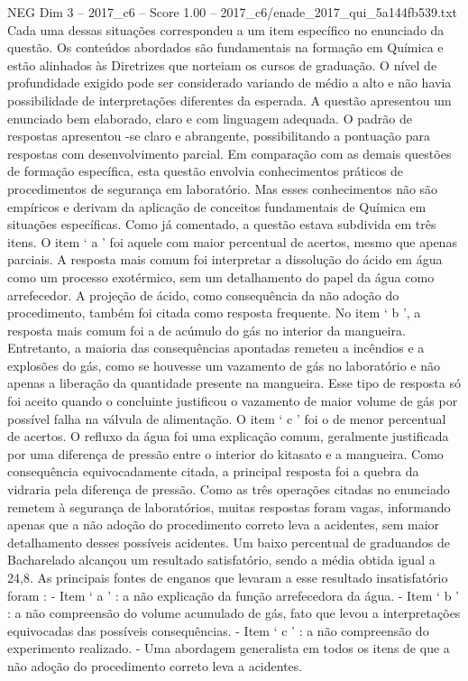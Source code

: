 \begin{textsample}{NEG Dim 3 – 2017\_c6 – Score 1.00 – 2017\_c6/enade\_2017\_qui\_5a144fb539.txt}
Cada uma dessas situações correspondeu a um item específico no enunciado da questão.
Os conteúdos abordados são fundamentais na formação em Química e estão alinhados às Diretrizes que norteiam os cursos de graduação.
O nível de profundidade exigido pode ser considerado variando de médio a alto e não havia possibilidade de interpretações diferentes da esperada.
A questão apresentou um enunciado bem elaborado, claro e com linguagem adequada.
O padrão de respostas apresentou -se claro e abrangente, possibilitando a pontuação para respostas com desenvolvimento parcial.
Em comparação com as demais questões de formação específica, esta questão envolvia conhecimentos práticos de procedimentos de segurança em laboratório.
Mas esses conhecimentos não são empíricos e derivam da aplicação de conceitos fundamentais de Química em situações específicas.
Como já comentado, a questão estava subdivida em três itens.
O item ‘ a ’ foi aquele com maior percentual de acertos, mesmo que apenas parciais.
A resposta mais comum foi interpretar a dissolução do ácido em água como um processo exotérmico, sem um detalhamento do papel da água como arrefecedor.
A projeção de ácido, como consequência da não adoção do procedimento, também foi citada como resposta frequente.
No item ‘ b ’, a resposta mais comum foi a de acúmulo do gás no interior da mangueira.
Entretanto, a maioria das consequências apontadas remeteu a incêndios e a explosões do gás, como se houvesse um vazamento de gás no laboratório e não apenas a liberação da quantidade presente na mangueira.
Esse tipo de resposta só foi aceito quando o concluinte justificou o vazamento de maior volume de gás por possível falha na válvula de alimentação.
O item ‘ c ’ foi o de menor percentual de acertos.
O refluxo da água foi uma explicação comum, geralmente justificada por uma diferença de pressão entre o interior do kitasato e a mangueira.
Como consequência equivocadamente citada, a principal resposta foi a quebra da vidraria pela diferença de pressão.
Como as três operações citadas no enunciado remetem à segurança de laboratórios, muitas respostas foram vagas, informando apenas que a não adoção do procedimento correto leva a acidentes, sem maior detalhamento desses possíveis acidentes.
Um baixo percentual de graduandos de Bacharelado alcançou um resultado satisfatório, sendo a média obtida igual a 24,8.
As principais fontes de enganos que levaram a esse resultado insatisfatório foram : - Item ‘ a ’ : a não explicação da função arrefecedora da água. - Item ‘ b ’ : a não compreensão do volume acumulado de gás, fato que levou a interpretações equivocadas das possíveis consequências. - Item ‘ c ’ : a não compreensão do experimento realizado. - Uma abordagem generalista em todos os itens de que a não adoção do procedimento correto leva a acidentes.

\end{textsample}
